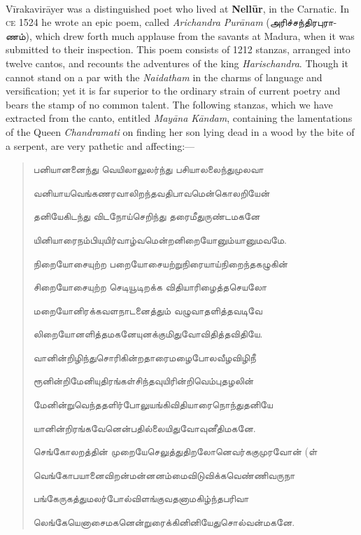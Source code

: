 \documentclass{article}
\newcommand{\TamilText}[1]{\texttamil{#1}}
\newcommand{\tam}[1]{\TamilText{#1}}
\begin{document}
\paragraph{}
V\={i}rakavir\={a}yer was a distinguished poet who lived at \textbf{Nell\={u}r}, in the Carnatic. In \textsc{ce} 1524 he wrote an epic poem, called \emph{Arichandra Pur\={a}nam} (\tam{அரிச்சந்திரபுராணம்}), which drew forth much applause from the savants at Madura, when it was submitted to their inspection. This poem consists of 1212 stanzas, arranged into twelve cantos, and recounts the adventures of the king \emph{Harischandra}. Though it cannot stand on a par with the \emph{Naidatham} in the charms of language and versification; yet it is far superior to the ordinary strain of current poetry and bears the stamp of no common talent. The following stanzas, which we have extracted from the canto, entitled \emph{May\={a}na K\={a}ndam}, containing the lamentations of the Queen \emph{Chandramati} on finding her son lying dead in a wood by the bite of a serpent, are very pathetic and affecting:---
\begin{quotation}\small
\tam{பனியானனைந்து வெயிலாலுலர்ந்து பசியாலலைந்துமுலவா}

\tam{வனியாயவெங்கணரவாலிறந்தவதிபாவமென்கொலறியேன்‌}

\tam{தனியேகிடந்து விடநோய்செறிந்து தரைமீதுருண்டமகனே}

\tam{யினியாரைநம்பியுயிர்வாழ்வமென்றனிறையோனும்யானுமவமே}.

\bigskip

\tam{நிறையோசையுற்ற பறையோசையற்றுநிரையாய்நிறைந்தகழுகின்‌}

\tam{சிறையோசையுற்ற செடியூடிறக்க விதியாரிழைத்தசெயலோ}

\tam{மறையோனிரக்கவளநாடனைத்தும்‌ வழுவாதளித்தவடிவே}

\tam{லிறையோனளித்தமகனேயுனக்குமிதுவோவிதித்தவிதியே}.

\bigskip

\tam{வானின்றிழிந்துசொரிகின்றதாரைமழைபோலவீழவிழிநீ}

\tam{ரூனின்றிமேனியுதிரங்கள்‌சிந்தவுயிரின்றிவெம்புதழலின்‌}

\tam{மேனின்றுவெந்ததளிர்போலுயங்கிவிதியாரைநொந்துதனியே}

\tam{யானின்றிரங்கவேனென்பதில்லையிதுவோவுனீதிமகனே}.

\bigskip

\tam{செங்கோலறத்தின்‌ முறையேசெலுத்துதிறலோனெவர்ககுமுரவோன்‌} (\tam{ள்‌}

\tam{வெங்கோபயானைவிறன்மன்னனம்மைவிடுவிக்கவெண்ணிவருநா}

\tam{பங்கேருகத்துமலர்போல்‌விளங்குவதனாமகிழ்ந்தபரிவா}

\tam{லெங்கேயெனாசைமகனென்றுரைக்கினினியேதுசொல்வன்மகனே}.
\end{quotation}
\end{document}
